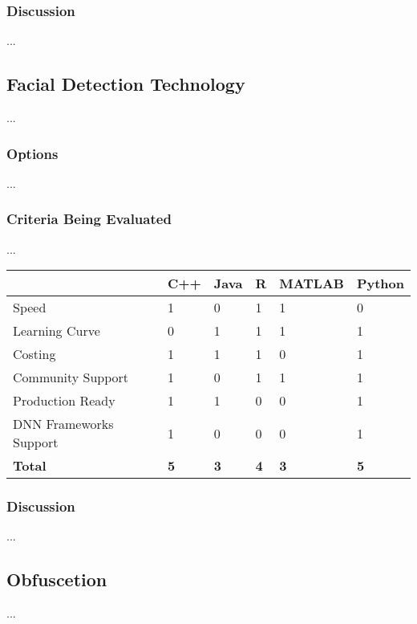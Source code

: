 \subsubsection{Discussion}
...

\subsection{Facial Detection Technology}
...
\subsubsection{Options}
...

\subsubsection{Criteria Being Evaluated}
...

\begin{center}
\begin{tabular}{|l|l|l|l|l|l|}
\hline
           & \textbf{C++} & \textbf{Java} & \textbf{R} & \textbf{MATLAB} & \textbf{Python}\\ \hline
Speed &     1      &      0     &      1     &      1     & 0          \\ \hline
Learning Curve &     0      &     1      &      1     &     1      &    1       \\ \hline
Costing &     1      &     1      &     1      &    0       &       1    \\ \hline
Community Support &      1     &     0      &   1        &      1     &     1      \\ \hline
Production Ready &     1      &     1      &    0       &       0    &      1     \\ \hline
DNN Frameworks Support &     1      &      0     &     0      &        0   &   1        \\ \hline
\textbf{Total} &      \textbf{5}     &   \textbf{3}        &      \textbf{4}     &     \textbf{3}      &    \textbf{5}       \\ \hline
\end{tabular}
\end{center}

\subsubsection{Discussion}
...

\subsection{Obfuscetion}
...
